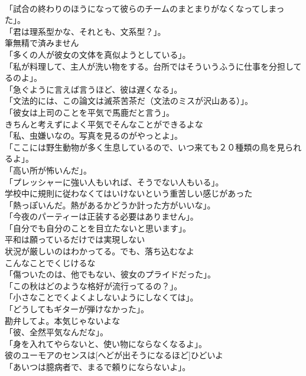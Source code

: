 \documentclass[8pt]{extreport}
\begin{document}
\begin{CJK}{UTF8}{min}
\\	「試合の終わりのほうになって彼らのチームのまとまりがなくなってしまった」。	
\\	「君は理系型かな、それとも、文系型？」。	
\\	筆無精で済みません	
\\	「多くの人が彼女の文体を真似ようとしている」。	
\\	「私が料理して、主人が洗い物をする。台所ではそういうふうに仕事を分担してるのよ」。	
\\	「急ぐように言えば言うほど、彼は遅くなる」。	
\\	「文法的には、この論文は滅茶苦茶だ（文法のミスが沢山ある）」。	
\\	「彼女は上司のことを平気で馬鹿だと言う」。	
\\	きちんと考えずによく平気でそんなことができるよな	
\\	「私、虫嫌いなの。写真を見るのがやっとよ」。	
\\	「ここには野生動物が多く生息しているので、いつ来ても２０種類の鳥を見られるよ」。	
\\	「高い所が怖いんだ」。	
\\	「プレッシャーに強い人もいれば、そうでない人もいる」。	
\\	学校中に規則に従わなくてはいけないという重苦しい感じがあった	
\\	「熱っぽいんだ。熱があるかどうか計った方がいいな」。	
\\	「今夜のパーティーは正装する必要はありません」。	
\\	「自分でも自分のことを目立たないと思います」。	
\\	平和は願っているだけでは実現しない	
\\	状況が厳しいのはわかってる。でも、落ち込むなよ	
\\	こんなことでくじけるな	
\\	「傷ついたのは、他でもない、彼女のプライドだった」。	
\\	「この秋はどのような格好が流行ってるの？」。	
\\	「小さなことでくよくよしないようにしなくては」。	
\\	「どうしてもギターが弾けなかった」。	
\\	勘弁してよ。本気じゃないよな	
\\	「彼、全然平気なんだな」。	
\\	「身を入れてやらないと、使い物にならなくなるよ」。	
\\	彼のユーモアのセンスは[へどが出そうになるほど]ひどいよ	
\\	「あいつは臆病者で、まるで頼りにならないよ」。	

\end{CJK}
\end{document}
